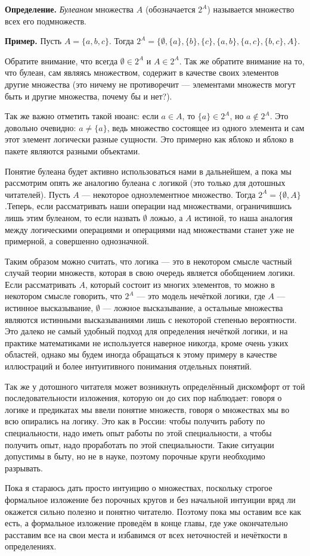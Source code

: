 {\bfseries Определение.} {\slshape Булеаном} множества $A$ (обозначается $2^A$) называется множество всех его подмножеств.

{\bfseries Пример.} Пусть $A = \{a, b, c\}$. Тогда $2^A = \{\emptyset, \{a\}, \{b\}, \{c\}, \{a, b\}, \{a, c\}, \{b, c\}, A\}$.

Обратите внимание, что всегда $\emptyset \in 2^A$ и $A\in 2^A$. Так же обратите внимание на то, что булеан, сам являясь множеством, содержит в качестве своих элементов другие множества (это ничему не противоречит — элементами множеств могут быть и другие множества, почему бы и нет?).

Так же важно отметить такой нюанс: если $a \in A$, то $\{a\} \in 2^A$, но $a \not \in 2^A$. Это довольно очевидно: $a\not = \{a\}$, ведь множество состоящее из одного элемента и сам этот элемент логически разные сущности. Это примерно как яблоко и яблоко в пакете являются разными объектами.

Понятие булеана будет активно использоваться нами в дальнейшем, а пока мы рассмотрим опять же аналогию булеана с логикой (это только для дотошных читателей). Пусть $A$ — некоторое одноэлементное множество. Тогда $2^A = \{\emptyset, A\}$.Теперь, если рассматривать наши операции над множествами, ограничившись лишь этим булеаном, то если назвать $\emptyset$ ложью, а $A$ истиной, то наша аналогия между логическими операциями и операциями над множествами станет уже не примерной, а совершенно однозначной.

Таким образом можно считать, что логика — это в некотором смысле частный случай теории множеств, которая в свою очередь является обобщением логики. Если рассматривать $A$, который состоит из многих элементов, то можно в некотором смысле говорить, что $2^A$ — это модель нечёткой логики, где $A$ — истинное высказывание, $\emptyset$ — ложное высказывание, а остальные множества являются истинными высказываниями лишь с некоторой степенью вероятности. Это далеко не самый удобный подход для определения нечёткой логики, и на практике математиками не используется наверное никогда, кроме очень узких областей, однако мы будем иногда обращаться к этому примеру в качестве иллюстраций и более интуитивного понимания отдельных понятий.

Так же у дотошного читателя может возникнуть определённый дискомфорт от той последовательности изложения, которую он до сих пор наблюдает: говоря о логике и предикатах мы ввели понятие множеств, говоря о множествах мы во всю опирались на логику. Это как в России: чтобы получить работу по специальности, надо иметь опыт работы по этой специальности, а чтобы получить опыт, надо проработать по этой специальности. Такие ситуации допустимы в быту, но не в науке, поэтому порочные круги необходимо разрывать.

Пока я стараюсь дать просто интуицию о множествах, поскольку строгое формальное изложение без порочных кругов и без начальной интуиции вряд ли окажется сильно полезно и понятно читателю. Поэтому пока мы оставим все как есть, а формальное изложение проведём в конце главы, где уже окончательно расставим все на свои места и избавимся от всех неточностей и нечёткости в определениях.
